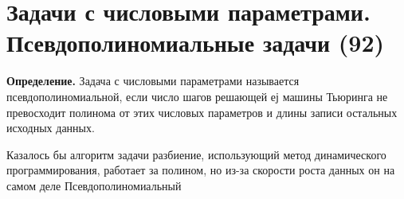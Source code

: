 \documentclass[40pt]{article}
\begin{document}
\section{Задачи с числовыми параметрами. Псевдополиномиальные задачи (92)}

 \textbf{Определение.} Задача с числовыми параметрами называется псевдополиномиальной, если число шагов решающей еј машины Тьюринга не
превосходит полинома от этих числовых параметров и длины записи
остальных исходных данных.
 
    \par Казалось бы алгоритм задачи разбиение, использующий метод динамического программирования, работает за полином, но из-за скорости роста данных он на самом деле Псевдополиномиальный
\end{document}
